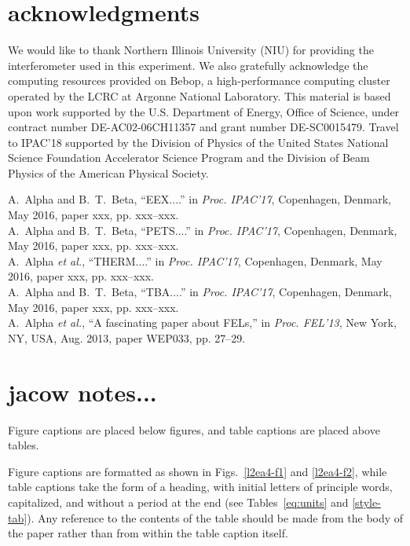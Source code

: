 \documentclass[letterpaper,  %
              ]{jacow-2_3}   %
\begin{document}
\section{acknowledgments}
We would like to thank 
Northern Illinois University (NIU) for providing the 
interferometer used in this experiment. 
We also gratefully acknowledge the computing resources
provided on Bebop, a high-performance computing cluster
operated by the LCRC at Argonne National Laboratory.
This material is based upon work supported by the 
U.S. Department of Energy, Office of Science, under 
contract number DE-AC02-06CH11357 and grant number DE-SC0015479. 
Travel to IPAC'18 supported by the Division of Physics 
of the United States National Science Foundation 
Accelerator Science Program and the Division of 
Beam Physics of the American Physical Society.


\begin{thebibliography}{9}
A.~Alpha and B.~T.~Beta, “EEX....”
in \textit{Proc. IPAC’17}, 
Copenhagen, Denmark, May 2016, 
paper xxx, pp. xxx--xxx.\\

A.~Alpha and B.~T.~Beta, “PETS....”
in \textit{Proc. IPAC’17}, 
Copenhagen, Denmark, May 2016, 
paper xxx, pp. xxx--xxx.\\

A.~Alpha \emph{et al.}, “THERM....”
in \textit{Proc. IPAC’17}, 
Copenhagen, Denmark, May 2016, 
paper xxx, pp. xxx--xxx.\\

A.~Alpha and B.~T.~Beta, “TBA....”
in \textit{Proc. IPAC’17}, 
Copenhagen, Denmark, May 2016, 
paper xxx, pp. xxx--xxx.\\

A.~Alpha \emph{et al.}, 
“A fascinating paper about FELs,”
in \emph{Proc. FEL’13}, 
New York, NY, USA, Aug. 2013, 
paper WEP033, pp. 27--29.\\

\end{thebibliography}


\section{jacow notes...}
Figure captions are placed below figures, and table
captions are placed above tables.

Figure captions are formatted as shown in Figs.~\ref{l2ea4-f1} and \ref{l2ea4-f2},
while table captions take the form of a heading,
with initial letters of principle words, capitalized, and
without a period at the end (see Tables~\ref{eq:units} and \ref{style-tab}).
Any reference to the contents of the table should be made from
the body of the paper rather than from within the table
caption itself.
\end{document}
